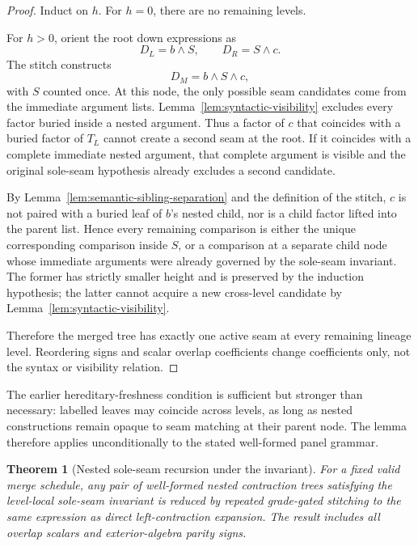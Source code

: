 \documentclass[11pt]{article}
\newtheorem{theorem}{Theorem}
\begin{document}
\begin{proof}
Induct on \(h\). For \(h=0\), there are no remaining levels.

For \(h>0\), orient the root down expressions as
\[
D_L=b\wedge S,\qquad D_R=S\wedge c.
\]
The stitch constructs
\[
D_M=b\wedge S\wedge c,
\]
with \(S\) counted once. At this node, the only possible seam candidates
come from the immediate argument lists. Lemma~\ref{lem:syntactic-visibility}
excludes every factor buried inside a nested argument. Thus a factor of \(c\)
that coincides with a buried factor of \(T_L\) cannot create a second seam at
the root. If it coincides with a complete immediate nested argument, that
complete argument is visible and the original sole-seam hypothesis already
excludes a second candidate.

By Lemma~\ref{lem:semantic-sibling-separation} and the definition of the
stitch, \(c\) is not paired with a buried leaf of \(b\)'s nested child, nor is
a child factor lifted into the parent list. Hence every remaining comparison is
either the unique corresponding comparison inside \(S\), or a comparison at a
separate child node whose immediate arguments were already governed by the
sole-seam invariant. The former has strictly smaller height and is preserved
by the induction hypothesis; the latter cannot acquire a new cross-level
candidate by Lemma~\ref{lem:syntactic-visibility}.

Therefore the merged tree has exactly one active seam at every remaining
lineage level. Reordering signs and scalar overlap coefficients change
coefficients only, not the syntax or visibility relation.
\end{proof}

The earlier hereditary-freshness condition is sufficient but stronger than
necessary: labelled leaves may coincide across levels, as long as nested
constructions remain opaque to seam matching at their parent node. The lemma
therefore applies unconditionally to the stated well-formed panel grammar.

\begin{theorem}[Nested sole-seam recursion under the invariant]
\label{thm:nested-induction}
For a fixed valid merge schedule, any pair of well-formed nested contraction
trees satisfying the level-local sole-seam invariant is reduced by repeated
grade-gated stitching to the same expression as direct left-contraction
expansion. The result includes all overlap scalars and exterior-algebra parity
signs.
\end{theorem}
\end{document}
